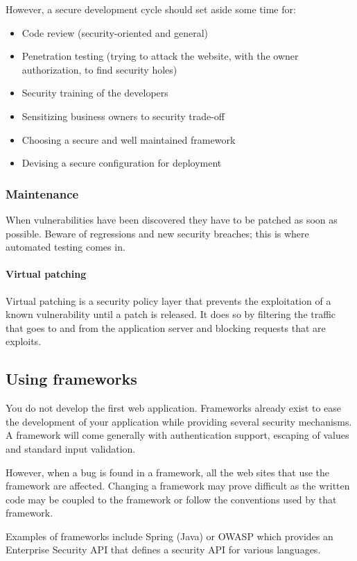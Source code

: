 However, a secure development cycle should set aside some time for:
\begin{itemize}
\item Code review (security-oriented and general)
\item Penetration testing (trying to attack the website, with the
  owner authorization, to find security holes)
\item Security training of the developers
\item Sensitizing business owners to security trade-off
\item Choosing a secure and well maintained framework
\item Devising a secure configuration for deployment
\end{itemize}

\subsubsection{Maintenance}
When vulnerabilities have been discovered they have to be patched as soon as
possible. Beware of regressions and new security breaches; this is where
automated testing comes in.

\paragraph{Virtual patching}
\label{sec:virtual-patching}
Virtual patching is a security policy layer that prevents the exploitation of
a known vulnerability until a patch is released.
It does so by filtering the traffic that goes to and from the application
server and blocking requests that are exploits.

\subsection{Using frameworks}

You do not develop the first web application. Frameworks already exist to
ease the development of your application while providing several security
mechanisms.
A framework will come generally with authentication support, escaping of
values and standard input validation.

However, when a bug is found in a framework, all the web sites that use the
framework are affected. Changing a framework may prove difficult as the
written code may be coupled to the framework or follow the conventions used by
that framework.

Examples of frameworks include Spring (Java) or OWASP which provides an Enterprise
Security API that defines a security API for various languages.

